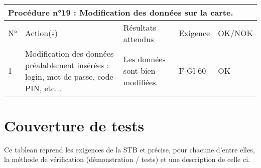 \documentclass[a4paper,11pt,french]{article}
\begin{document}
\paragraph{}
\begin{tabular}{|p{1cm}|p{5cm}|p{5cm}|p{2cm}|p{2cm}|}
\hline
\multicolumn{5}{|l|}{Procédure n°19 : Modification des données sur la carte.} \\
\hline
N° & Action(s) & Résultats attendus & Exigence & OK/NOK \\
\hline
1 & Modification des données préalablement insérées : login, mot de passe, code PIN, etc... & Les données sont bien modifiées. & F-Gl-60 & OK \\
\hline
\end{tabular}


\section{Couverture de tests}
Ce tableau reprend les exigences de la STB et précise, pour chacune d’entre elles, la méthode
de vérification (démonstration / tests) et une description de celle ci.
\end{document}
